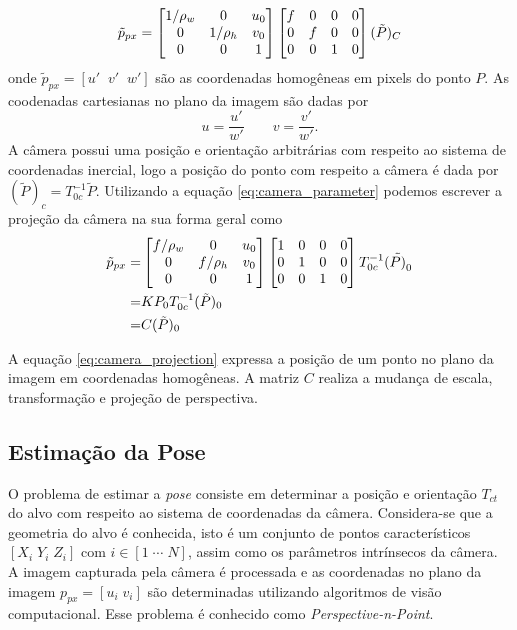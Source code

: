 \begin{equation} \label{eq:camera_parameter}
{\tilde{p}_{px}} = 
\begin{bmatrix}
	1/\rho_w & 0 & u_0 \\
	0        & 1/\rho_h &v_0 \\
	0 & 0 & 1 \\
\end{bmatrix}
\begin{bmatrix} f & 0 & 0 & 0\\
	 0 & f & 0 & 0\\
	 0 & 0 & 1 & 0	
\end{bmatrix}
(\tilde{{P}})_C
\end{equation}
onde $\tilde{p}_{px} = [u' \;\; v' \;\; w']$ são as coordenadas homogêneas em pixels do ponto $P$. As coodenadas cartesianas no plano da imagem são dadas por
\begin{equation}
u = \frac{u'}{w'} \qquad v = \frac{v'}{w'}.
\end{equation} 
A câmera possui uma posição e orientação arbitrárias com respeito ao sistema de coordenadas inercial, logo a posição do ponto com respeito a câmera é dada por  $({\tilde{P}})_c = {T}_{0c}^{-1} {\tilde{P}}$. Utilizando a equação \eqref{eq:camera_parameter} podemos escrever a projeção da câmera na sua forma geral como
\begin{align}\label{eq:camera_projection}
{\tilde{p}_{px}} =& 
\begin{bmatrix}
	f/\rho_w & 0 & u_0 \\
	0        & f/\rho_h &v_0 \\
	0 & 0 & 1 \\
\end{bmatrix}
\begin{bmatrix}  1 & 0 & 0 & 0\\
	 0 & 1 & 0 & 0\\
	 0 & 0 & 1 & 0	
\end{bmatrix}
{T}_{0c}^{-1} (\tilde{{P})}_0\\
=& {K} {P}_0 {T}_{0c}^{-1} (\tilde{{P}})_0 \\ 
=& {C} ({\tilde{P})_0}
\end{align}

A equação \eqref{eq:camera_projection} expressa a posição de um ponto no plano da imagem em coordenadas homogêneas. A matriz $C$ realiza a mudança de escala, transformação e projeção de perspectiva. 


\subsection{Estimação da Pose}
O problema de estimar a \textit{pose} consiste em determinar a posição e orientação ${T}_{ct}$ do alvo com respeito ao sistema de coordenadas da câmera. Considera-se que a geometria do alvo é conhecida, isto é um conjunto de pontos característicos $[X_i \; Y_i \; Z_i]$ com $i \in [1\; \cdots \; N]$, assim como os parâmetros intrínsecos da câmera. A imagem capturada pela câmera é processada e as coordenadas no plano da imagem $p_{px} = [u_i\; v_i]$ são determinadas utilizando algoritmos de visão computacional. Esse problema é conhecido como \textit{Perspective-n-Point}.

